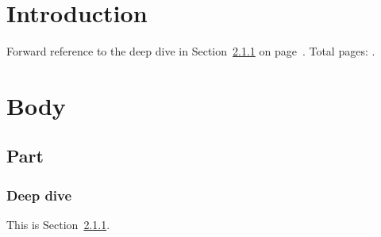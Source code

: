 \documentclass{article}
\begin{document}
\section{Introduction}\label{sec:intro}
Forward reference to the deep dive in Section~\ref{ssub:deep} on
page~\pageref{ssub:deep}. Total pages: \lastpage.
\lipsum[1-3]

\section{Body}\label{sec:body}
\subsection{Part}\label{sub:part}
\subsubsection{Deep dive}\label{ssub:deep}
This is Section~\ref{ssub:deep}.
\lipsum[1-2]
\end{document}
